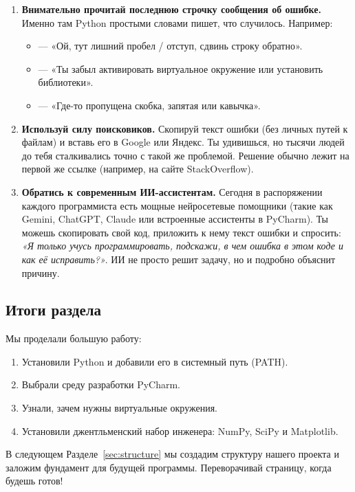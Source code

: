 \begin{enumerate}
	\item \textbf{Внимательно прочитай последнюю строчку сообщения об ошибке.} Именно там Python простыми словами пишет, что случилось. Например:
	\begin{itemize}
		\item {} — «Ой, тут лишний пробел / отступ, сдвинь строку обратно».
		\item {} — «Ты забыл активировать виртуальное окружение или установить библиотеки».
		\item {} — «Где-то пропущена скобка, запятая или кавычка».
	\end{itemize}
	\item \textbf{Используй силу поисковиков.} Скопируй текст ошибки (без личных путей к файлам) и вставь его в Google или Яндекс. Ты удивишься, но тысячи людей до тебя сталкивались точно с такой же проблемой. Решение обычно лежит на первой же ссылке (например, на сайте StackOverflow).
	\item \textbf{Обратись к современным ИИ-ассистентам.} Сегодня в распоряжении каждого программиста есть мощные нейросетевые помощники (такие как Gemini, ChatGPT, Claude или встроенные ассистенты в PyCharm). Ты можешь скопировать свой код, приложить к нему текст ошибки и спросить: \textit{«Я только учусь программировать, подскажи, в чем ошибка в этом коде и как её исправить?»}. ИИ не просто решит задачу, но и подробно объяснит причину.
\end{enumerate}



\subsection{Итоги раздела}
Мы проделали большую работу:
\begin{enumerate}
    \item Установили Python и добавили его в системный путь (PATH).
    \item Выбрали среду разработки PyCharm.
    \item Узнали, зачем нужны виртуальные окружения.
    \item Установили джентльменский набор инженера: NumPy, SciPy и Matplotlib.
\end{enumerate}

В следующем Разделе~\ref{sec:structure} мы создадим структуру нашего проекта и заложим фундамент для будущей программы. Переворачивай страницу, когда будешь готов!

